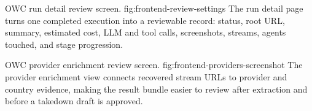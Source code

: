   {OWC run detail review screen.}
  {fig:frontend-review-settings}
  {The run detail page turns one completed execution into a reviewable record: status,
  root URL, summary, estimated cost, LLM and tool calls, screenshots, streams, agents
  touched, and stage progression.}

  {OWC provider enrichment review screen.}
  {fig:frontend-providers-screenshot}
  {The provider enrichment view connects recovered stream URLs to provider and country
  evidence, making the result bundle easier to review after extraction and before a
  takedown draft is approved.}
